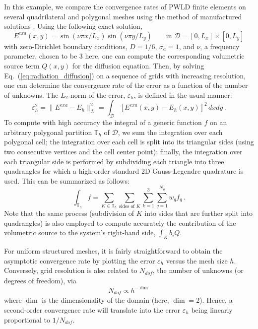 \documentclass[preprint,10pt]{elsarticle}
\newcommand{\D}{\mathcal{D}}
\newcommand{\eqt}[1]{Eq.~(\ref{#1})}                     %
\newcommand{\tf}{b}
\begin{document}
In this example, we compare the convergence rates of PWLD finite elements on several quadrilateral
and polygonal meshes using the method of manufactured solutions \cite{roache_2009}. Using the following exact solution,
\begin{equation} \label{eq:mms1}
	E^{\textit{exa}}(x,y) = \sin(\nu \pi x/L_x) \sin(\nu\pi y/L_y) \qquad \text{in } \D=[0,L_x]\times [0,L_y]
\end{equation}
with zero-Dirichlet boundary conditions, $D=1/6$, $\sigma_a=1$, and $\nu$, a frequency parameter, chosen to be 3 here, one can compute 
the corresponding volumetric source term $Q(x,y)$ for the diffusion equation. Then, by solving \eqt{eq:radiation_diffusion} 
on a sequence of
grids with increasing resolution, one can determine the convergence rate of the error
as a function of the number of unknowns. The $L_2$-norm of the error, $\varepsilon_h$, is defined in the usual manner:
\begin{equation}
	\varepsilon_h^2 = \| E^{\textit{exa}} - E_h \|^2_\D = \int_\D \left[ E^{\textit{exa}}(x,y)  - E_h(x,y) \right]^2 \, dxdy	\, .
\end{equation}
To compute with high accuracy the integral of a generic function $f$ on an arbitrary polygonal partition $\mathbb{T}_h$ of $\D$, 
we sum the integration over each polygonal cell; the integration over each cell is split into its triangular sides (using two 
consecutive vertices and the cell center point); finally, the integration over each triangular side is performed by 
subdividing each triangle into three quadrangles for which a high-order standard 2D Gauss-Legendre quadrature is used. 
This can be summarized as follows:
\begin{equation}
	\int_{\mathbb{T}_h} f  = \sum_{K\in \mathbb{T}_h} \sum_{\text{sides of }K} \sum_{k=1}^3 
	\sum_{q=1}^{N_q} w_q f_q
	\, .
\end{equation}
Note that the same process (subdivision of $K$ into sides that are further split into quadrangles) is also employed 
to compute accurately the contribution of the volumetric source to the system's right-hand side, $\int_K \tf_i Q$.

For uniform structured meshes, it is fairly straightforward to obtain the asymptotic convergence rate by plotting the error 
$\varepsilon_h$ versus the mesh size $h$. Conversely, grid resolution is also related to $N_\textit{dof}$, the number of unknowns 
(or degrees of freedom), via 
\begin{equation}
N_{\textit{dof}} \propto  h ^{-\dim} 
\end{equation}
where $\dim$ is the dimensionality of the domain (here, $\dim = 2$). Hence, a second-order convergence rate will 
translate into the error $\varepsilon_h$ being linearly proportional to $1/N_{\textit{dof}}$.
\end{document}
